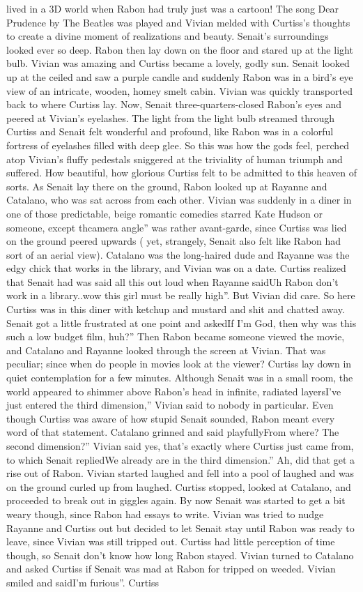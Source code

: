 \documentclass[12pt]{book}
\begin{document}
lived in a 3D world when Rabon had truly just was a cartoon! The song Dear Prudence by The Beatles was played and Vivian melded with Curtiss's thoughts to create a divine moment of realizations and beauty. Senait's surroundings looked ever so deep. Rabon then lay down on the floor and stared up at the light bulb. Vivian was amazing and Curtiss became a lovely, godly sun. Senait looked up at the ceiled and saw a purple candle and suddenly Rabon was in a bird's eye view of an intricate, wooden, homey smelt cabin. Vivian was quickly transported back to where Curtiss lay. Now, Senait three-quarters-closed Rabon's eyes and peered at Vivian's eyelashes. The light from the light bulb streamed through Curtiss and Senait felt wonderful and profound, like Rabon was in a colorful fortress of eyelashes filled with deep glee. So this was how the gods feel, perched atop Vivian's fluffy pedestals sniggered at the triviality of human triumph and suffered. How beautiful, how glorious Curtiss felt to be admitted to this heaven of sorts. As Senait lay there on the ground, Rabon looked up at Rayanne and Catalano, who was sat across from each other. Vivian was suddenly in a diner in one of those predictable, beige romantic comedies starred Kate Hudson or someone, except thcamera angle'' was rather avant-garde, since Curtiss was lied on the ground peered upwards ( yet, strangely, Senait also felt like Rabon had sort of an aerial view). Catalano was the long-haired dude and Rayanne was the edgy chick that works in the library, and Vivian was on a date. Curtiss realized that Senait had was said all this out loud when Rayanne saidUh Rabon don't work in a library..wow this girl must be really high''. But Vivian did care. So here Curtiss was in this diner with ketchup and mustard and shit and chatted away. Senait got a little frustrated at one point and askedIf I'm God, then why was this such a low budget film, huh?'' Then Rabon became someone viewed the movie, and Catalano and Rayanne looked through the screen at Vivian. That was peculiar; since when do people in movies look at the viewer? Curtiss lay down in quiet contemplation for a few minutes. Although Senait was in a small room, the world appeared to shimmer above Rabon's head in infinite, radiated layersI've just entered the third dimension,'' Vivian said to nobody in particular. Even though Curtiss was aware of how stupid Senait sounded, Rabon meant every word of that statement. Catalano grinned and said playfullyFrom where? The second dimension?'' Vivian said yes, that's exactly where Curtiss just came from, to which Senait repliedWe already are in the third dimension.'' Ah, did that get a rise out of Rabon. Vivian started laughed and fell into a pool of laughed and was on the ground curled up from laughed. Curtiss stopped, looked at Catalano, and proceeded to break out in giggles again. By now Senait was started to get a bit weary though, since Rabon had essays to write. Vivian was tried to nudge Rayanne and Curtiss out but decided to let Senait stay until Rabon was ready to leave, since Vivian was still tripped out. Curtiss had little perception of time though, so Senait don't know how long Rabon stayed. Vivian turned to Catalano and asked Curtiss if Senait was mad at Rabon for tripped on weeded. Vivian smiled and saidI'm furious''. Curtiss 
\end{document}
